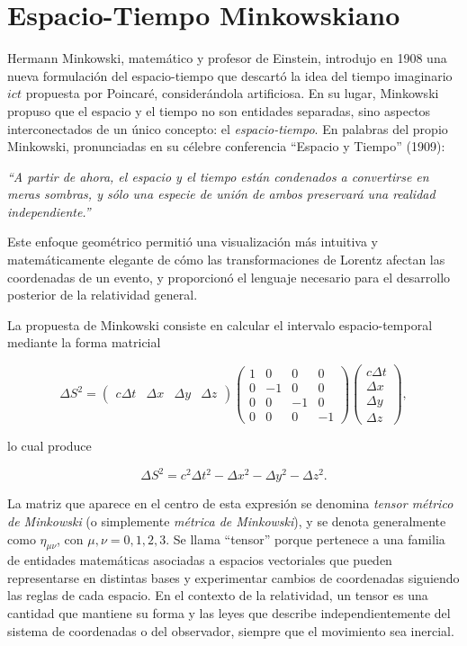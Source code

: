 \section{Espacio-Tiempo Minkowskiano}

Hermann Minkowski, matemático y profesor de Einstein, introdujo en 1908 una nueva formulación del espacio-tiempo que descartó la idea del tiempo imaginario $ict$ propuesta por Poincaré, considerándola artificiosa. En su lugar, Minkowski propuso que el espacio y el tiempo no son entidades separadas, sino aspectos interconectados de un único concepto: el \emph{espacio-tiempo}. En palabras del propio Minkowski, pronunciadas en su célebre conferencia ``Espacio y Tiempo'' (1909):

\emph{``A partir de ahora, el espacio y el tiempo están condenados a convertirse en meras sombras, y sólo una especie de unión de ambos preservará una realidad independiente.''}

Este enfoque geométrico permitió una visualización más intuitiva y matemáticamente elegante de cómo las transformaciones de Lorentz afectan las coordenadas de un evento, y proporcionó el lenguaje necesario para el desarrollo posterior de la relatividad general.

La propuesta de Minkowski consiste en calcular el intervalo espacio-temporal mediante la forma matricial

$$
\Delta S^2 =
\begin{pmatrix} c\Delta t & \Delta x & \Delta y & \Delta z \end{pmatrix}
\begin{pmatrix} 1 & 0 & 0 & 0 \\ 0 & -1 & 0 & 0 \\ 0 & 0 & -1 & 0 \\ 0 & 0 & 0 & -1 \end{pmatrix}
\begin{pmatrix} c\Delta t \\ \Delta x \\ \Delta y \\ \Delta z \end{pmatrix},
$$

lo cual produce

$$
\Delta S^2 = c^2\Delta t^2 - \Delta x^2 - \Delta y^2 - \Delta z^2.
$$

La matriz que aparece en el centro de esta expresión se denomina \emph{tensor métrico de Minkowski} (o simplemente \emph{métrica de Minkowski}), y se denota generalmente como $\eta_{\mu\nu}$, con $\mu, \nu = 0, 1, 2, 3$. Se llama ``tensor'' porque pertenece a una familia de entidades matemáticas asociadas a espacios vectoriales que pueden representarse en distintas bases y experimentar cambios de coordenadas siguiendo las reglas de cada espacio. En el contexto de la relatividad, un tensor es una cantidad que mantiene su forma y las leyes que describe independientemente del sistema de coordenadas o del observador, siempre que el movimiento sea inercial.

